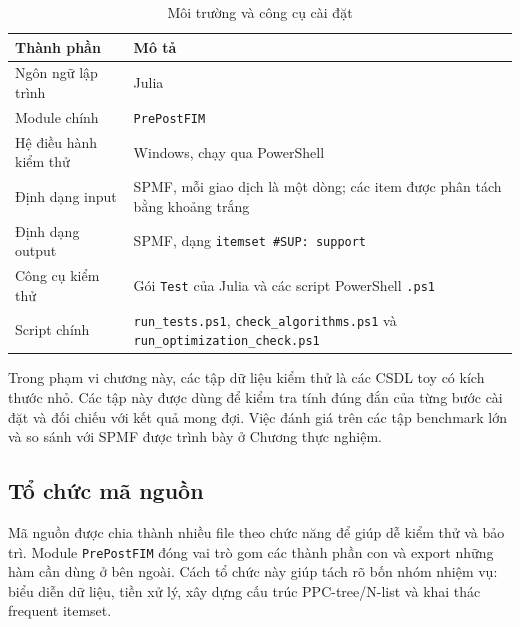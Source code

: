 \begin{table}[H]
\centering
\caption{Môi trường và công cụ cài đặt}
\label{tab:implementation-environment}

\begin{tabularx}{\textwidth}{
    >{\raggedright\arraybackslash}p{}
    >{\raggedright\arraybackslash}X
}
\toprule
\textbf{Thành phần} & \textbf{Mô tả} \\
\midrule

Ngôn ngữ lập trình
& Julia \\

Module chính
& \texttt{PrePostFIM} \\

Hệ điều hành kiểm thử
& Windows, chạy qua PowerShell \\

Định dạng input
& SPMF, mỗi giao dịch là một dòng; các item được phân tách bằng khoảng trắng \\

Định dạng output
& SPMF, dạng \texttt{itemset \#SUP: support} \\

Công cụ kiểm thử
& Gói \texttt{Test} của Julia và các script PowerShell \texttt{.ps1} \\

Script chính
& \texttt{run\_tests.ps1},
  \texttt{check\_algorithms.ps1} và
  \texttt{run\_optimization\_check.ps1} \\

\bottomrule
\end{tabularx}
\end{table}

Trong phạm vi chương này, các tập dữ liệu kiểm thử là các CSDL toy có kích thước nhỏ. Các tập này được dùng để kiểm tra tính đúng đắn của từng bước cài đặt và đối chiếu với kết quả mong đợi. Việc đánh giá trên các tập benchmark lớn và so sánh với SPMF được trình bày ở Chương thực nghiệm.

\subsection{Tổ chức mã nguồn}
\label{subsec:source-organization}

Mã nguồn được chia thành nhiều file theo chức năng để giúp dễ kiểm thử và bảo trì. Module \texttt{PrePostFIM} đóng vai trò gom các thành phần con và export những hàm cần dùng ở bên ngoài. Cách tổ chức này giúp tách rõ bốn nhóm nhiệm vụ: biểu diễn dữ liệu, tiền xử lý, xây dựng cấu trúc PPC-tree/N-list và khai thác frequent itemset.

